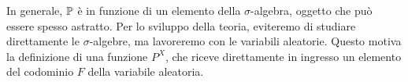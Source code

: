 \begin{figure}[H]
  \centering
  \def\firstcircle{(-.1,-.1) circle (1.2cm)}
  \def\drect {(-1.5, -1.5) rectangle (1.5, 1.8)}
\end{figure}
In generale, $\mathbb P$ è in funzione di un elemento della $\sigma$-algebra, oggetto che può essere spesso astratto. Per lo sviluppo della teoria, eviteremo di studiare direttamente le $\sigma$-algebre, ma lavoreremo con le variabili aleatorie. Questo motiva la definizione di una funzione $P^X$, che riceve direttamente in ingresso un elemento del codominio $F$ della variabile aleatoria.

